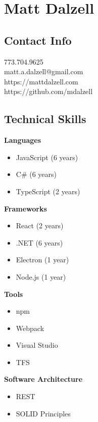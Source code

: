 \documentclass[12pt]{article}
\begin{document}

\section*{Matt Dalzell}

\setlength{\columnsep}{4em}
\setlength{\columnseprule}{0.1pt}
\begin{paracol}{2}

\subsection*{Contact Info}
773.704.9625 \\
matt.a.dalzell@gmail.com \\ 
https://mattdalzell.com \\
https://github.com/mdalzell

\subsection*{Technical Skills} 

\textbf{Languages}
\begin{itemize}
    \item JavaScript {\footnotesize{(6 years)}}
    \item C\# {\footnotesize{(6 years)}}
    \item TypeScript {\footnotesize{(2 years)}}
\end{itemize}

\noindent \textbf{Frameworks}
\begin{itemize}
    \item React {\footnotesize{(2 years)}}
    \item .NET {\footnotesize{(6 years)}}
    \item Electron {\footnotesize{(1 year)}}
    \item Node.js {\footnotesize{(1 year)}}
\end{itemize}

\noindent \textbf{Tools}
\begin{itemize}
    \item npm
    \item Webpack
    \item Visual Studio
    \item TFS
\end{itemize}

\noindent \textbf{Software Architecture}
\begin{itemize}
    \item REST
    \item SOLID Principles
\end{itemize}


\end{paracol}
\end{document}
